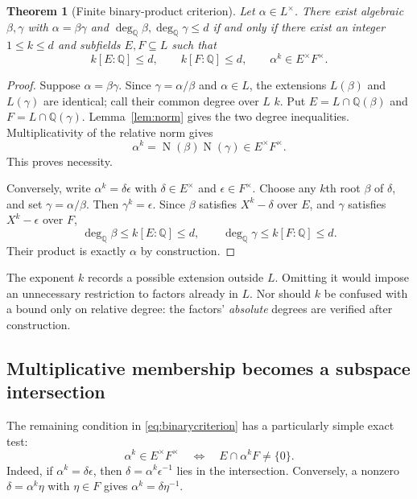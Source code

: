 \documentclass[11pt,a4paper]{article}
\newtheorem{theorem}{Theorem}[section]
\theoremstyle{definition}\newtheorem{definition}[theorem]{Definition}
\theoremstyle{remark}\newtheorem{remark}[theorem]{Remark}
\newcommand{\Q}{\mathbb{Q}}\newcommand{\C}{\mathbb{C}}
\newcommand{\Norm}{\operatorname{N}}
\newcommand{\degQ}{\deg_{\Q}}
\begin{document}
\begin{theorem}[Finite binary-product criterion]\label{thm:binary}
Let $\alpha\in L^\times$. There exist algebraic $\beta,\gamma$ with $\alpha=\beta\gamma$ and $\degQ\beta,\degQ\gamma\leq d$ if and only if there exist an integer $1\leq k\leq d$ and subfields $E,F\subseteq L$ such that
\begin{equation}
k[E:\Q]\leq d,\qquad k[F:\Q]\leq d,
\qquad \alpha^k\in E^\times F^\times.\label{eq:binarycriterion}
\end{equation}
\end{theorem}
\begin{proof}
Suppose $\alpha=\beta\gamma$. Since $\gamma=\alpha/\beta$ and $\alpha\in L$, the extensions $L(\beta)$ and $L(\gamma)$ are identical; call their common degree over $L$ $k$. Put $E=L\cap\Q(\beta)$ and $F=L\cap\Q(\gamma)$. Lemma~\ref{lem:norm} gives the two degree inequalities. Multiplicativity of the relative norm gives
\[
\alpha^k=\Norm(\beta)\Norm(\gamma)\in E^\times F^\times.
\]
This proves necessity.

Conversely, write $\alpha^k=\delta\epsilon$ with $\delta\in E^\times$ and $\epsilon\in F^\times$. Choose any $k$th root $\beta$ of $\delta$, and set $\gamma=\alpha/\beta$. Then $\gamma^k=\epsilon$. Since $\beta$ satisfies $X^k-\delta$ over $E$, and $\gamma$ satisfies $X^k-\epsilon$ over $F$,
\[
\degQ\beta\leq k[E:\Q]\leq d,\qquad
\degQ\gamma\leq k[F:\Q]\leq d.
\]
Their product is exactly $\alpha$ by construction.\end{proof}

The exponent $k$ records a possible extension outside $L$. Omitting it would impose an unnecessary restriction to factors already in $L$. Nor should $k$ be confused with a bound only on relative degree: the factors' \emph{absolute} degrees are verified after construction.

\subsection{Multiplicative membership becomes a subspace intersection}
The remaining condition in \eqref{eq:binarycriterion} has a particularly simple exact test:
\begin{equation}
\alpha^k\in E^\times F^\times
\quad\Longleftrightarrow\quad
E\cap\alpha^k F\neq\{0\}.\label{eq:intersection}
\end{equation}
Indeed, if $\alpha^k=\delta\epsilon$, then $\delta=\alpha^k\epsilon^{-1}$ lies in the intersection. Conversely, a nonzero $\delta=\alpha^k\eta$ with $\eta\in F$ gives $\alpha^k=\delta\eta^{-1}$.
\end{document}
